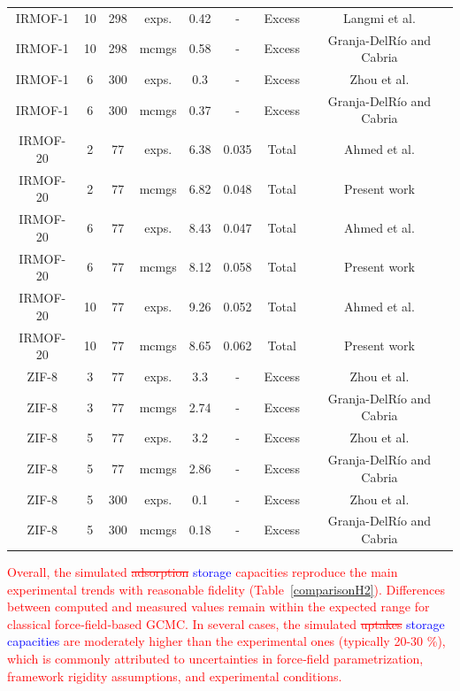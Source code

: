 \documentclass[review]{elsarticle}
\begin{document}
\begin{table}[H]
\begin{center}
\begin{tabular}{cccccccc}
			IRMOF-1      & 10   & 298 & exps.     &  0.42 &	     - & Excess & Langmi et al. \cite{lrnmb14} \\
			IRMOF-1      & 10   & 298 & mcmgs     &  0.58 &      - & Excess & Granja-DelRío and Cabria \cite{gc24c}\\
			IRMOF-1      &  6   & 300 & exps.     &  0.3  &	     - & Excess & Zhou et al. \cite{zwhy07} \\
			IRMOF-1      &  6   & 300 & mcmgs     &  0.37 &	     - & Excess & Granja-DelRío and Cabria \cite{gc24a}\\
			\hline
			IRMOF-20     &  2   &  77 & exps.     &  6.38 &  0.035 & Total  & Ahmed et al. \cite{asp+19} \\
			IRMOF-20     &  2   &  77 & mcmgs     &  6.82 &  0.048 & Total  & Present work\\
			IRMOF-20     &  6   &  77 & exps.     &  8.43 &  0.047 & Total  & Ahmed et al. \cite{asp+19} \\
			IRMOF-20     &  6   &  77 & mcmgs     &  8.12 &  0.058 & Total  & Present work\\
			IRMOF-20     & 10   &  77 & exps.     &  9.26 &  0.052 & Total  & Ahmed et al. \cite{asp+19} \\
			IRMOF-20     & 10   &  77 & mcmgs     &  8.65 &  0.062 & Total  & Present work\\	
			\hline
			ZIF-8        &  3   &  77 & exps.     &  3.3  &	     - & Excess & Zhou et al. \cite{zwhy07} \\
			ZIF-8        &  3   &  77 & mcmgs     &  2.74 &      - & Excess & Granja-DelRío and Cabria \cite{gc24b} \\
			ZIF-8        &  5   &  77 & exps.     &  3.2  &	     - & Excess & Zhou et al. \cite{zwhy07} \\
			ZIF-8        &  5   &  77 & mcmgs     &  2.86 &	     - & Excess & Granja-DelRío and Cabria \cite{gc24b} \\
			ZIF-8        &  5   & 300 & exps.     &  0.1  &	     - & Excess & Zhou et al. \cite{zwhy07} \\
			ZIF-8        &  5   & 300 & mcmgs     &  0.18 &	     - & Excess & Granja-DelRío and Cabria \cite{gc24b} \\
			\hline
		\end{tabular}
	\end{center}
\end{table}

\textcolor{red}{
Overall, the simulated \sout{adsorption} \textcolor{blue}{storage} capacities 
reproduce the main experimental trends with reasonable fidelity 
(Table~\ref{comparisonH2}). Differences between computed and measured values 
remain within the expected range for classical force‑field‑based GCMC. In 
several cases, the simulated \sout{uptakes} \textcolor{blue}{storage 
capacities} are moderately higher than the experimental ones (typically 20-30 
\%), which is commonly attributed to uncertainties in force‑field 
parametrization, framework rigidity assumptions, and experimental conditions.
}
\end{document}
